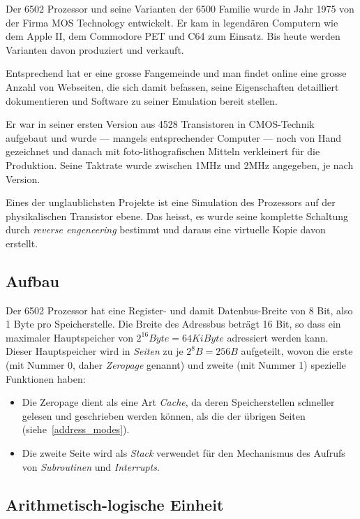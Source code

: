 \documentclass[11pt]{scrartcl}
\newcommand{\byte}{\unit{B}}
\begin{document}
Der 6502 Prozessor und seine Varianten der 6500 Familie wurde in Jahr
1975 von der Firma MOS Technology entwickelt. Er kam in legendären
Computern wie dem Apple II, dem Commodore PET und C64 zum Einsatz. Bis
heute werden Varianten davon produziert und verkauft.

Entsprechend hat er eine grosse Fangemeinde und man findet online eine
grosse Anzahl von Webseiten, die sich damit befassen, seine
Eigenschaften detailliert dokumentieren und Software zu seiner
Emulation bereit stellen.

Er war in seiner ersten Version aus 4528 Transistoren in CMOS-Technik
aufgebaut und wurde --- mangels entsprechender Computer --- noch von
Hand gezeichnet und danach mit foto-lithografischen Mitteln
verkleinert für die Produktion.  Seine Taktrate wurde zwischen
1\unit{MHz} und 2\unit{MHz} angegeben, je nach Version.

Eines der unglaublichsten Projekte ist eine Simulation des Prozessors
auf der physikalischen Transistor ebene. Das heisst, es wurde seine
komplette Schaltung durch \emph{reverse engeneering} bestimmt und
daraus eine virtuelle Kopie davon erstellt\cite*{thevisual6502}.

\subsection{Aufbau}

Der 6502 Prozessor hat eine Register- und damit Datenbus-Breite von 8
Bit, also 1 Byte pro Speicherstelle. Die Breite des Adressbus beträgt
16 Bit, so dass ein maximaler Hauptspeicher von
$2^{16}\unit{Byte} = 64 \unit{KiByte}$ adressiert werden kann. Dieser
Hauptspeicher wird in \emph{Seiten} zu je $2^8\byte=256\byte$
aufgeteilt, wovon die erste (mit Nummer 0, daher \emph{Zeropage}
genannt) und zweite (mit Nummer 1) spezielle Funktionen haben:

\begin{itemize}
\item Die Zeropage dient als eine Art \emph{Cache}, da deren
  Speicherstellen schneller gelesen und geschrieben werden können, als
  die der übrigen Seiten (siehe~\ref{address_modes}).
\item Die zweite Seite wird als \emph{Stack} verwendet für den
  Mechanismus des Aufrufs von \emph{Subroutinen} und
  \emph{Interrupts}.
\end{itemize}

\subsection{Arithmetisch-logische Einheit}
\label{sec:alu}
\end{document}
